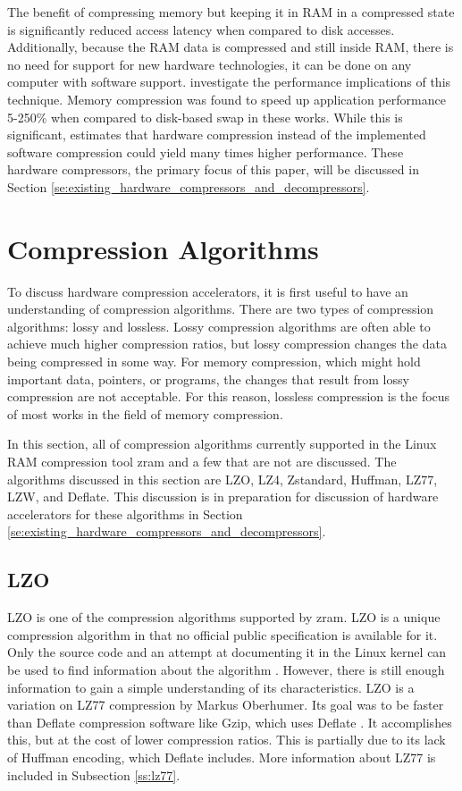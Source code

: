 \documentclass[doublespace,nopageskip]{VTthesis}
\begin{document}
The benefit of compressing memory but keeping it in RAM in a compressed state is significantly reduced access latency when compared to disk accesses. Additionally, because the RAM data is compressed and still inside RAM, there is no need for support for new hardware technologies, it can be done on any computer with software support. \cite{memorycompressionperformance, compressedmemoryimproveperformance} investigate the performance implications of this technique. Memory compression was found to speed up application performance 5-250\% when compared to disk-based swap in these works. While this is significant, \cite{memorycompressionperformance} estimates that hardware compression instead of the implemented software compression could yield many times higher performance. These hardware compressors, the primary focus of this paper, will be discussed in Section \ref{se:existing_hardware_compressors_and_decompressors}.

\section{Compression Algorithms}\label{se:compression_algorithms}
To discuss hardware compression accelerators, it is first useful to have an understanding of compression algorithms. There are two types of compression algorithms: lossy and lossless. Lossy compression algorithms are often able to achieve much higher compression ratios, but lossy compression changes the data being compressed in some way. For memory compression, which might hold important data, pointers, or programs, the changes that result from lossy compression are not acceptable. For this reason, lossless compression is the focus of most works in the field of memory compression.

In this section, all of compression algorithms currently supported in the Linux RAM compression tool zram and a few that are not are discussed. The algorithms discussed in this section are LZO, LZ4, Zstandard, Huffman, LZ77, LZW, and Deflate. This discussion is in preparation for discussion of hardware accelerators for these algorithms in Section \ref{se:existing_hardware_compressors_and_decompressors}.

\subsection{LZO}\label{ss:lzo}
LZO is one of the compression algorithms supported by zram. LZO is a unique compression algorithm in that no official public specification is available for it. Only the source code and an attempt at documenting it in the Linux kernel can be used to find information about the algorithm \cite{linuxlzo}. However, there is still enough information to gain a simple understanding of its characteristics. LZO is a variation on LZ77 compression by Markus Oberhumer. Its goal was to be faster than Deflate compression software like Gzip, which uses Deflate \cite{lzo}. It accomplishes this, but at the cost of lower compression ratios. This is partially due to its lack of Huffman encoding, which Deflate includes. More information about LZ77 is included in Subsection \ref{ss:lz77}.
\end{document}
